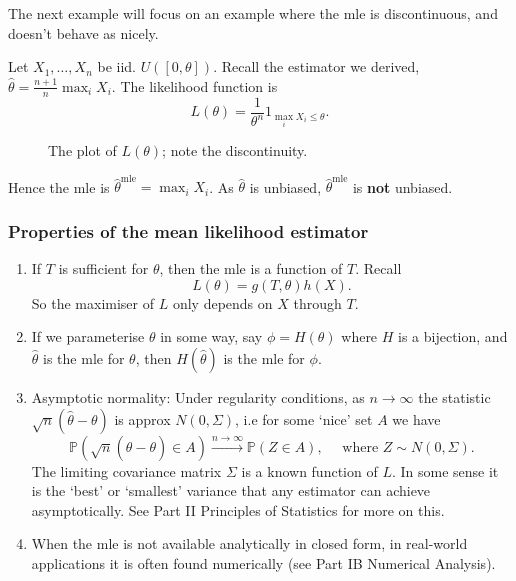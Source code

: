 \documentclass[egregdoesnotlikesansseriftitles,a4paper]{scrartcl}
\begin{document}
The next example will focus on an example where the mle is discontinuous, and doesn't behave as nicely.
\begin{example*}
     Let $X_1 , \ldots , X_n $ be iid. $U ([0, \theta])$. Recall the estimator we derived, $\hat{\theta}=\frac{n+1}{n }\max_i X_i$. The likelihood function is \[
     L (\theta)=\frac{1}{\theta^{n}} 1_{\max_i X_i \leq \theta}
     .\]
     \begin{figure}[H]
          \centering
          \caption{The plot of $L (\theta)$; note the discontinuity.}
     \end{figure}
     Hence the mle is $\hat{\theta}^{\operatorname{mle}}=\max_i X_{i}$. As $\hat{\theta}$ is unbiased, $\hat{\theta}^{\operatorname{mle}}$ is \textbf{not} unbiased.
\end{example*}
\subsubsection*{Properties of the mean likelihood estimator}
\begin{enumerate}
     \item If $T$ is sufficient for $\theta$, then the mle is a function of $T$. Recall \[
     L (\theta)=g (T, \theta)h (X)
     .\] So the maximiser of $L$ only depends on $X$ through $T$.
     \item If we parameterise $\theta$ in some way, say $\phi= H (\theta)$ where $H$ is a bijection, and $\hat{\theta}$ is the mle for $\theta$, then $H (\hat{\theta})$ is the mle for $\phi$.
     \item Asymptotic normality: Under regularity conditions, as $n \rightarrow \infty$ the statistic $\sqrt{n}(\hat{\theta}-\theta)$ is approx $N (0,\Sigma)$, i.e for some `nice' set $A$ we have \[
     \mathbb{P}(\sqrt{n}(\hat{\theta}-\theta) \in A) \xrightarrow{n \rightarrow \infty}\mathbb{P} (Z \in A), \quad \text{ where } Z \sim N (0, \Sigma)
     .\] The limiting covariance matrix $\Sigma$ is a known function of $L$. In some sense it is the `best' or `smallest' variance that any estimator can achieve asymptotically. See Part II Principles of Statistics for more on this.
     \item When the mle is not available analytically in closed form, in real-world applications it is often found numerically (see Part IB Numerical Analysis).
\end{enumerate}
\end{document}
